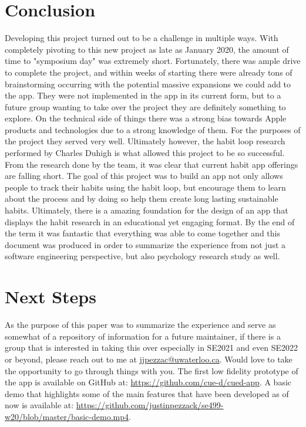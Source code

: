 \section{Conclusion}
Developing this project turned out to be a challenge in multiple ways. With completely pivoting to this new project as late as January 2020, the amount of time to "symposium day" was extremely short. Fortunately, there was ample drive to complete the project, and within weeks of starting there were already tons of brainstorming occurring with the potential massive expansions we could add to the app. They were not implemented in the app in its current form, but to a future group wanting to take over the project they are definitely something to explore. On the technical side of things there was a strong bias towards Apple products and technologies due to a strong knowledge of them. For the purposes of the project they served very well. Ultimately however, the habit loop research performed by Charles Duhigh is what allowed this project to be so successful. From the research done by the team, it was clear that current habit app offerings are falling short. The goal of this project was to build an app not only allows people to track their habits using the habit loop, but encourage them to learn about the process and by doing so help them create long lasting sustainable habits. Ultimately, there is a amazing foundation for the design of an app that displays the habit research in an educational yet engaging format. By the end of the term it was fantastic that everything was able to come together and this document was produced in order to summarize the experience from not just a software engineering perspective, but also psychology research study as well.
\section{Next Steps} 
As the purpose of this paper was to summarize the experience and serve as somewhat of a repository of information for a future maintainer, if there is a group that is interested in taking this over especially in SE2021 and even SE2022 or beyond, please reach out to me at \url{jjpezzac@uwaterloo.ca}. Would love to take the opportunity to go through things with you. The first low fidelity prototype of the app is available on GitHub at: \url{https://github.com/cue-d/cued-app}. A basic demo that highlights some of the main features that have been developed as of now is available at: \url{https://github.com/justinpezzack/se499-w20/blob/master/basic-demo.mp4}.